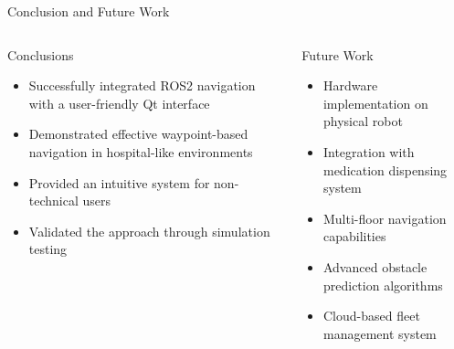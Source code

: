\documentclass[aspectratio=169]{beamer}
\begin{document}
\begin{frame}{Conclusion and Future Work}
  \begin{columns}
    \begin{column}{0.5\textwidth}
      \begin{block}{Conclusions}
        \begin{itemize}
        \item Successfully integrated ROS2 navigation with a user-friendly Qt interface
        \item Demonstrated effective waypoint-based navigation in hospital-like environments
        \item Provided an intuitive system for non-technical users
        \item Validated the approach through simulation testing
        \end{itemize}
      \end{block}
    \end{column}
    \begin{column}{0.5\textwidth}
      \begin{alertblock}{Future Work}
        \begin{itemize}
        \item Hardware implementation on physical robot
        \item Integration with medication dispensing system
        \item Multi-floor navigation capabilities
        \item Advanced obstacle prediction algorithms
        \item Cloud-based fleet management system
        \end{itemize}
      \end{alertblock}
    \end{column}
  \end{columns}
\end{frame}
\end{document}
